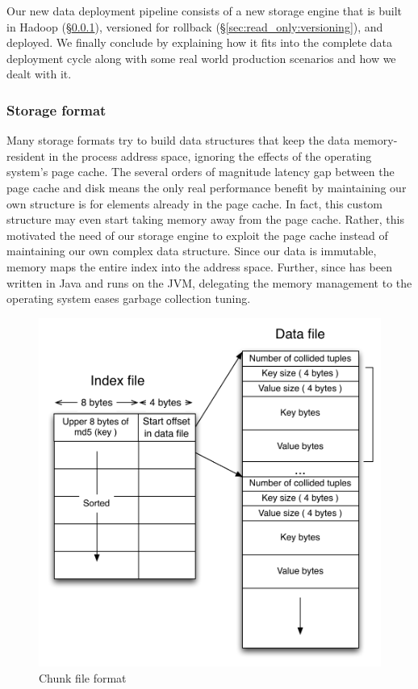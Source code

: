 Our new data deployment pipeline consists of a new storage engine that
is built in Hadoop (\S\ref{sec:read_only:storage_format}), versioned
for rollback (\S\ref{sec:read_only:versioning}), and deployed. We
finally conclude by explaining how it fits into the complete data
deployment cycle along with some real world production scenarios and
how we dealt with it. 


\subsubsection{Storage format}
\label{sec:read_only:storage_format}

Many storage formats try to build data structures that keep the data
memory-resident in the process address space, ignoring the effects of
the operating system's page cache. The several orders of magnitude 
latency gap between the page cache and disk means the only real 
performance benefit by maintaining our own structure is for elements 
already in the page cache. In fact, this custom structure may even 
start taking memory away from the page cache. Rather, this motivated 
the need of our storage engine to exploit the page cache instead of 
maintaining our own complex data structure. Since our data is immutable, 
\projectname{} memory maps the entire index into the address space. 
Further, since \projectname{} has been written in Java and runs on 
the JVM, delegating the memory management to the operating system 
eases garbage collection tuning.

\begin{figure}
  \centering
    \includegraphics[scale=0.45]{images/storage_format.pdf}
  \caption{Chunk file format}
  \label{storage_format}
\end{figure}

